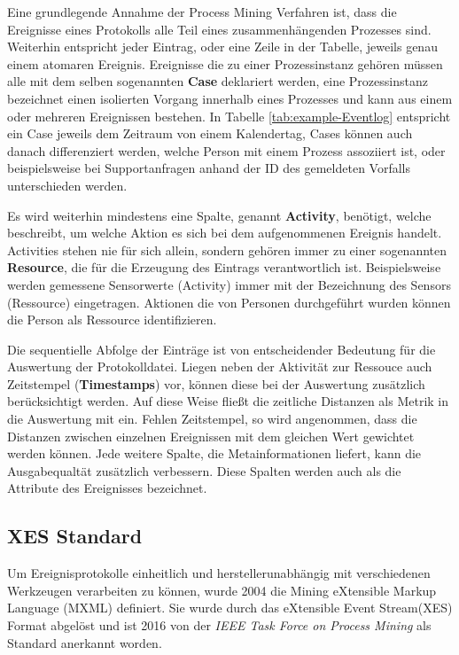 Eine grundlegende Annahme der Process Mining Verfahren ist, dass die Ereignisse eines Protokolls alle Teil eines zusammenhängenden Prozesses sind. Weiterhin entspricht jeder Eintrag, oder eine Zeile in der Tabelle, jeweils genau einem atomaren Ereignis. Ereignisse die zu einer Prozessinstanz gehören müssen alle mit dem selben sogenannten \textbf{Case} deklariert werden, eine Prozessinstanz bezeichnet einen isolierten Vorgang innerhalb eines Prozesses und kann aus einem oder mehreren Ereignissen bestehen. In Tabelle \ref{tab:example-Eventlog} entspricht ein Case jeweils dem Zeitraum von einem Kalendertag, Cases können auch danach differenziert werden, welche Person mit einem Prozess assoziiert ist, oder beispielsweise bei Supportanfragen anhand der ID des gemeldeten Vorfalls unterschieden werden.

Es wird weiterhin mindestens eine Spalte, genannt \textbf{Activity}, benötigt, welche beschreibt, um welche Aktion es sich bei dem aufgenommenen Ereignis handelt. Activities stehen nie für sich allein,  sondern gehören immer zu einer sogenannten \textbf{Resource}, die für die Erzeugung des Eintrags verantwortlich ist. Beispielsweise werden gemessene Sensorwerte (Activity) immer mit der Bezeichnung des Sensors (Ressource) eingetragen. Aktionen die von Personen durchgeführt wurden können die Person als Ressource identifizieren.

Die sequentielle Abfolge der Einträge ist von entscheidender Bedeutung für die Auswertung der Protokolldatei. Liegen neben der Aktivität zur Ressouce auch Zeitstempel (\textbf{Timestamps}) vor, können diese bei der Auswertung zusätzlich berücksichtigt werden. Auf diese Weise fließt die zeitliche Distanzen als Metrik in die Auswertung mit ein. Fehlen Zeitstempel, so wird angenommen, dass die Distanzen zwischen einzelnen Ereignissen mit dem gleichen Wert gewichtet werden können.
Jede weitere Spalte, die Metainformationen liefert, kann die Ausgabequaltät zusätzlich verbessern. Diese Spalten werden auch als die Attribute des Ereignisses bezeichnet. 
\newpage
\subsection{XES Standard}\label{sec:xes}
Um Ereignisprotokolle einheitlich und herstellerunabhängig mit verschiedenen Werkzeugen verarbeiten zu können, wurde 2004 die Mining eXtensible Markup Language (MXML) definiert. Sie wurde durch das eXtensible Event Stream(XES) Format abgelöst \cite{xesmxml} und ist 2016 von der \textit{IEEE Task Force on Process Mining} als Standard anerkannt worden. 

